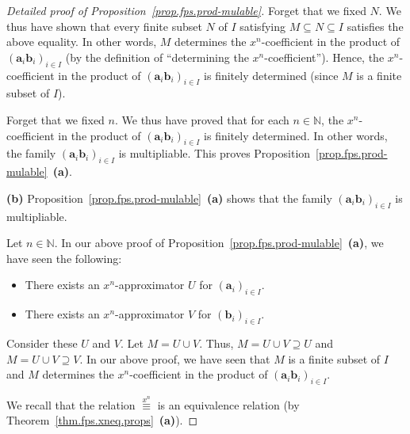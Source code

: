 \begin{proof}[Detailed proof of Proposition~\ref{prop.fps.prod-mulable}]
Forget that we fixed $N$. We thus have shown that every finite subset
$N$ of $I$ satisfying $M \subseteq N \subseteq I$ satisfies the above
equality. In other words, $M$ determines the $x^n$-coefficient in the
product of $\left(\mathbf{a}_{i} \mathbf{b}_{i}\right)_{i \in I}$ (by
the definition of ``determining the $x^n$-coefficient''). Hence, the
$x^n$-coefficient in the product of
$\left(\mathbf{a}_{i} \mathbf{b}_{i}\right)_{i \in I}$ is finitely
determined (since $M$ is a finite subset of $I$).

Forget that we fixed $n$. We thus have proved that for each
$n \in \mathbb{N}$, the $x^n$-coefficient in the product of
$\left(\mathbf{a}_{i} \mathbf{b}_{i}\right)_{i \in I}$ is finitely
determined. In other words, the family
$\left(\mathbf{a}_{i} \mathbf{b}_{i}\right)_{i \in I}$ is multipliable.
This proves Proposition~\ref{prop.fps.prod-mulable}~\textbf{(a)}.

\medskip

\textbf{(b)} Proposition~\ref{prop.fps.prod-mulable}~\textbf{(a)} shows
that the family
$\left(\mathbf{a}_{i} \mathbf{b}_{i}\right)_{i \in I}$ is multipliable.

Let $n \in \mathbb{N}$. In our above proof of
Proposition~\ref{prop.fps.prod-mulable}~\textbf{(a)}, we have seen the
following:
\begin{itemize}
\item There exists an $x^n$-approximator $U$ for
  $\left(\mathbf{a}_{i}\right)_{i \in I}$.
\item There exists an $x^n$-approximator $V$ for
  $\left(\mathbf{b}_{i}\right)_{i \in I}$.
\end{itemize}
Consider these $U$ and $V$. Let $M = U \cup V$. Thus,
$M = U \cup V \supseteq U$ and $M = U \cup V \supseteq V$. In our above
proof, we have seen that $M$ is a finite subset of $I$ and $M$
determines the $x^n$-coefficient in the product of
$\left(\mathbf{a}_{i} \mathbf{b}_{i}\right)_{i \in I}$.

We recall that the relation $\overset{x^n}{\equiv}$ is an equivalence
relation (by Theorem~\ref{thm.fps.xneq.props}~\textbf{(a)}).


\end{proof}
